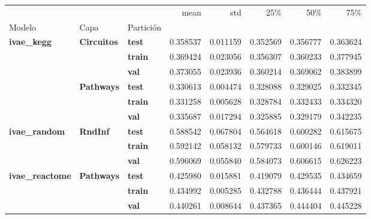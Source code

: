 \begin{tabular}{lllrrrrr}
\toprule
 &  &  & mean & std & 25\% & 50\% & 75\% \\
Modelo & Capa & Partición &  &  &  &  &  \\
\midrule
\multirow[t]{6}{*}{\textbf{ivae\_kegg}} & \multirow[t]{3}{*}{\textbf{Circuitos}} & \textbf{test} & 0.358537 & 0.011159 & 0.352569 & 0.356777 & 0.363624 \\
\textbf{} & \textbf{} & \textbf{train} & 0.369424 & 0.023056 & 0.356307 & 0.360233 & 0.377945 \\
\textbf{} & \textbf{} & \textbf{val} & 0.373055 & 0.023936 & 0.360214 & 0.369062 & 0.383899 \\
\cline{2-8}
\textbf{} & \multirow[t]{3}{*}{\textbf{Pathways}} & \textbf{test} & 0.330613 & 0.004474 & 0.328088 & 0.329025 & 0.332345 \\
\textbf{} & \textbf{} & \textbf{train} & 0.331258 & 0.005628 & 0.328784 & 0.332433 & 0.334320 \\
\textbf{} & \textbf{} & \textbf{val} & 0.335687 & 0.017294 & 0.325885 & 0.329179 & 0.342235 \\
\cline{1-8} \cline{2-8}
\multirow[t]{3}{*}{\textbf{ivae\_random}} & \multirow[t]{3}{*}{\textbf{RndInf}} & \textbf{test} & 0.588542 & 0.067804 & 0.564618 & 0.600282 & 0.615675 \\
\textbf{} & \textbf{} & \textbf{train} & 0.592142 & 0.058132 & 0.579733 & 0.600146 & 0.619011 \\
\textbf{} & \textbf{} & \textbf{val} & 0.596069 & 0.055840 & 0.584073 & 0.606615 & 0.626223 \\
\cline{1-8} \cline{2-8}
\multirow[t]{3}{*}{\textbf{ivae\_reactome}} & \multirow[t]{3}{*}{\textbf{Pathways}} & \textbf{test} & 0.425980 & 0.015881 & 0.419079 & 0.429535 & 0.434659 \\
\textbf{} & \textbf{} & \textbf{train} & 0.434992 & 0.005285 & 0.432788 & 0.436444 & 0.437921 \\
\textbf{} & \textbf{} & \textbf{val} & 0.440261 & 0.008644 & 0.437365 & 0.444404 & 0.445228 \\
\cline{1-8} \cline{2-8}
\bottomrule
\end{tabular}
